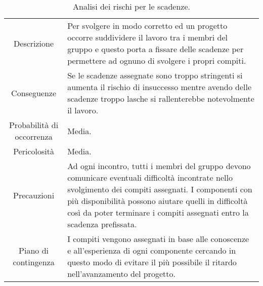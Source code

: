 \begin{table}[H]
	\begin{tabular}{|c|p{11.5cm}|}
		\rowcolor{darkblue} \hline
		\multicolumn{2}{|c|}{\textcolor{white}{\textbf{RO2 - Scadenze}}}\\ \hline
		Descrizione & Per svolgere in modo corretto ed \glo{efficiente} un progetto occorre suddividere il lavoro tra i membri del gruppo e questo porta a fissare delle scadenze per permettere ad ognuno di svolgere i propri compiti.\\ \hline
		Conseguenze & Se le scadenze assegnate sono troppo stringenti si aumenta il rischio di insuccesso mentre avendo delle scadenze troppo lasche si rallenterebbe notevolmente il lavoro.\\ \hline
		Probabilità di occorrenza & Media.\\ \hline
		Pericolosità & Media.\\ \hline
		Precauzioni & Ad ogni incontro, tutti i membri del gruppo devono comunicare eventuali difficoltà incontrate nello svolgimento dei compiti assegnati. I componenti con più disponibilità possono aiutare quelli in difficoltà così da poter terminare i compiti assegnati entro la scadenza prefissata.\\ \hline
		Piano di contingenza & I compiti vengono assegnati in base alle conoscenze e all'esperienza di ogni componente cercando in questo modo di evitare il più possibile il ritardo nell'avanzamento del progetto.\\ \hline
	\end{tabular}
	\caption{\label{tab:RO2}Analisi dei rischi per le scadenze.}
\end{table}